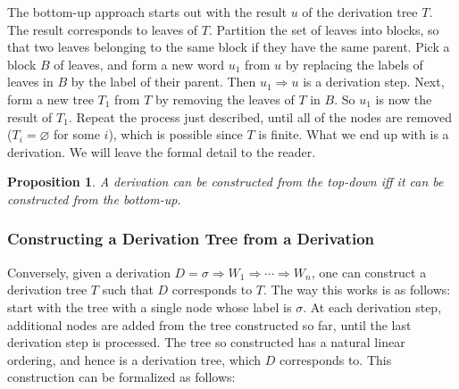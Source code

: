 \documentclass[12pt]{article}
\newtheorem{prop}{Proposition}
\begin{document}
The bottom-up approach starts out with the result $u$ of the derivation tree $T$.  The result corresponds to leaves of $T$.  Partition the set of leaves into blocks, so that two leaves belonging to the same block if they have the same parent.  Pick a block $B$ of leaves, and form a new word $u_1$ from $u$ by replacing the labels of leaves in $B$ by the label of their parent.  Then $u_1\Rightarrow u$ is a derivation step.  Next, form a new tree $T_1$ from $T$ by removing the leaves of $T$ in $B$.  So $u_1$ is now the result of $T_1$.  Repeat the process just described, until all of the nodes are removed ($T_i=\varnothing$ for some $i$), which is possible since $T$ is finite.  What we end up with is a derivation.  We will leave the formal detail to the reader.

\begin{prop}  A derivation can be constructed from the top-down iff it can be constructed from the bottom-up. \end{prop}

\subsubsection*{Constructing a Derivation Tree from a Derivation}

Conversely, given a derivation $D=\sigma \Rightarrow W_1 \Rightarrow \cdots \Rightarrow W_n$, one can construct a derivation tree $T$ such that $D$ corresponds to $T$.  The way this works is as follows: start with the tree with a single node whose label is $\sigma$.  At each derivation step, additional nodes are added from the tree constructed so far, until the last derivation step is processed.  The tree so constructed has a natural linear ordering, and hence is a derivation tree, which $D$ corresponds to.  This construction can be formalized as follows:
\end{document}
